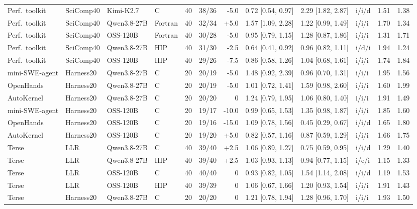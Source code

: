 \begin{widetable}[!p]
\begin{tabular}{@{}llllrrrlllrr@{}}
Perf.\ toolkit & SciComp40 & Kimi-K2.7 & C & 40 & 38/36 & -5.0 & 0.72 [0.54, 0.97] & 2.29 [1.82, 2.87] & i/i/d & 1.51 & 1.38 \\
Perf.\ toolkit & SciComp40 & Qwen3.8-27B & Fortran & 40 & 32/34 & +5.0 & 1.57 [1.09, 2.28] & 1.22 [0.99, 1.49] & i/i/i & 1.70 & 1.34 \\
Perf.\ toolkit & SciComp40 & OSS-120B & Fortran & 40 & 30/28 & -5.0 & 0.95 [0.79, 1.15] & 1.28 [0.87, 1.86] & i/i/i & 1.31 & 1.71 \\
Perf.\ toolkit & SciComp40 & Qwen3.8-27B & HIP & 40 & 31/30 & -2.5 & 0.64 [0.41, 0.92] & 0.96 [0.82, 1.11] & i/d/i & 1.94 & 1.24 \\
Perf.\ toolkit & SciComp40 & OSS-120B & HIP & 40 & 29/26 & -7.5 & 0.86 [0.58, 1.26] & 1.04 [0.68, 1.61] & i/i/i & 1.74 & 1.84 \\
mini-SWE-agent & Harness20 & Qwen3.8-27B & C & 20 & 20/19 & -5.0 & 1.48 [0.92, 2.39] & 0.96 [0.70, 1.31] & i/i/i & 1.95 & 1.56 \\
OpenHands & Harness20 & Qwen3.8-27B & C & 20 & 20/19 & -5.0 & 1.01 [0.72, 1.41] & 1.59 [0.98, 2.60] & i/i/i & 1.60 & 1.99 \\
AutoKernel & Harness20 & Qwen3.8-27B & C & 20 & 20/20 & 0 & 1.24 [0.79, 1.95] & 1.06 [0.80, 1.40] & i/i/i & 1.91 & 1.49 \\
mini-SWE-agent & Harness20 & OSS-120B & C & 20 & 19/17 & -10.0 & 0.99 [0.65, 1.53] & 1.35 [0.98, 1.87] & i/i/i & 1.85 & 1.60 \\
OpenHands & Harness20 & OSS-120B & C & 20 & 19/16 & -15.0 & 1.09 [0.78, 1.56] & 0.45 [0.29, 0.67] & i/i/d & 1.65 & 1.80 \\
AutoKernel & Harness20 & OSS-120B & C & 20 & 19/20 & +5.0 & 0.82 [0.57, 1.16] & 0.87 [0.59, 1.29] & i/i/i & 1.66 & 1.75 \\
Terse & LLR & Qwen3.8-27B & C & 40 & 39/40 & +2.5 & 1.06 [0.89, 1.27] & 0.75 [0.59, 0.95] & i/i/d & 1.29 & 1.40 \\
Terse & LLR & Qwen3.8-27B & HIP & 40 & 39/40 & +2.5 & 1.03 [0.93, 1.13] & 0.94 [0.77, 1.15] & i/e/i & 1.15 & 1.33 \\
Terse & LLR & OSS-120B & C & 40 & 40/40 & 0 & 0.93 [0.82, 1.05] & 1.54 [1.14, 2.08] & i/i/d & 1.19 & 1.53 \\
Terse & LLR & OSS-120B & HIP & 40 & 39/39 & 0 & 1.06 [0.67, 1.66] & 1.20 [0.93, 1.54] & i/i/i & 1.91 & 1.43 \\
Terse & Harness20 & Qwen3.8-27B & C & 20 & 20/20 & 0 & 1.21 [0.78, 1.94] & 1.28 [0.96, 1.70] & i/i/i & 1.93 & 1.50 \\

\end{tabular}
\end{widetable}
